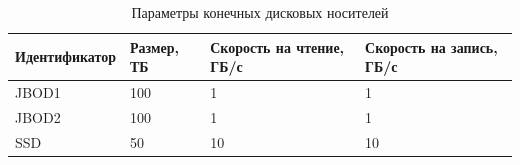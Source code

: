 \begin{table}[]
\centering
\caption{Параметры конечных дисковых носителей}
\label{tab:storage}
\begin{tabularx}{\textwidth}{|l|l|l|l|}
\hline
Идентификатор & Размер, ТБ & Скорость на чтение, ГБ/с & Скорость на запись, ГБ/с \\ \hline
JBOD1         & 100        & 1                        & 1                        \\ \hline
JBOD2         & 100        & 1                        & 1                        \\ \hline
SSD           & 50         & 10                       & 10                       \\ \hline
\end{tabularx}
\end{table}
